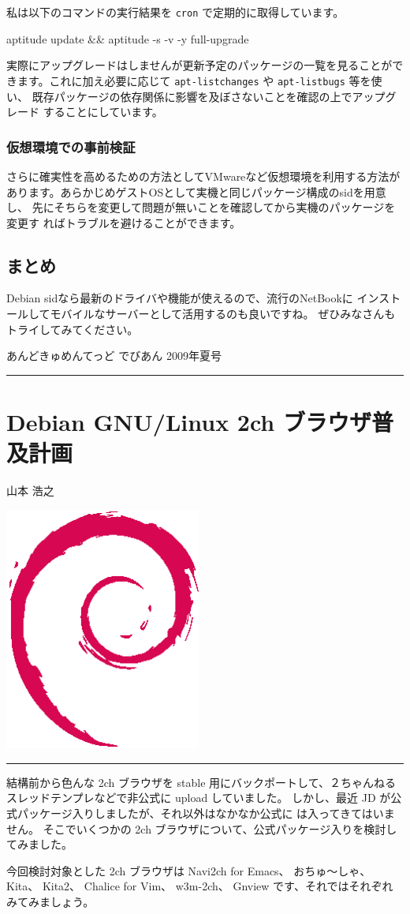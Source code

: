 \documentclass[mingoth,a4paper]{jsarticle}
\renewcommand{\dancersection}[2]{%
\newpage
あんどきゅめんてっど でびあん 2009年夏号
%
\vspace{0.1mm}\\
{\color{dancerlightblue}\rule{\hsize}{2mm}}

%
%
\begin{minipage}[t]{0.6\hsize}
\color{dancerdarkblue}
\vspace{1cm}
\section{#1}
\hfill{}#2\\
\end{minipage}
\begin{minipage}[t]{0.4\hsize}
\vspace{-2cm}
\hfill{}\includegraphics[height=8cm]{image200502/openlogo-nd.eps}\\
\vspace{-5cm}
\end{minipage}
%
%
{\color{dancerdarkblue}\rule{0.74\hsize}{2mm}}
%
\vspace{2cm}
}
\begin{document}
私は以下のコマンドの実行結果を \texttt{cron} で定期的に取得しています。

\begin{commandline}
aptitude update && aptitude -s -v -y full-upgrade
\end{commandline}

実際にアップグレードはしませんが更新予定のパッケージの一覧を見ることがで
きます。これに加え必要に応じて \texttt{apt-listchanges} や
\texttt{apt-listbugs} 等を使い、
既存パッケージの依存関係に影響を及ぼさないことを確認の上でアップグレード
することにしています。

\subsubsection{仮想環境での事前検証}

さらに確実性を高めるための方法としてVMwareなど仮想環境を利用する方法が
あります。あらかじめゲストOSとして実機と同じパッケージ構成のsidを用意し、
先にそちらを変更して問題が無いことを確認してから実機のパッケージを変更す
ればトラブルを避けることができます。

\subsection{まとめ}

Debian sidなら最新のドライバや機能が使えるので、流行のNetBookに
インストールしてモバイルなサーバーとして活用するのも良いですね。
ぜひみなさんもトライしてみてください。

\dancersection{Debian GNU/Linux 2ch ブラウザ普及計画}{山本 浩之}

結構前から色んな 2ch ブラウザを stable 用にバックポートして、２ちゃんねる
スレッドテンプレなどで非公式に upload していました。
しかし、最近 JD が公式パッケージ入りしましたが、それ以外はなかなか公式に
は入ってきてはいません。
そこでいくつかの 2ch ブラウザについて、公式パッケージ入りを検討してみました。

今回検討対象とした 2ch ブラウザは
 Navi2ch for Emacs、
 おちゅ〜しゃ、
 Kita、
 Kita2、
 Chalice for Vim、
 w3m-2ch、
 Gnview
です、それではそれぞれみてみましょう。

\newcommand{\yamamotobrowserlist}[2]{%
\begin{tabular}{|p{30zw}|p{20zw}|}
\hline 
#2 & #1\\
\hline 
\end{tabular}
}
\end{document}
